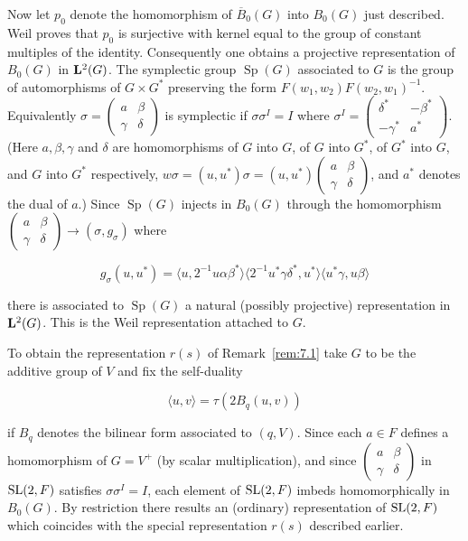 \begin{remark}
Now let $p_0$ denote the homomorphism of $\overline{B}_0(G)$ into $B_0(G)$ just described. Weil proves that $p_0$ is surjective with kernel equal to the group of constant multiples of the identity. Consequently one obtains a projective representation of $B_0(G)$ in $\mathbf{L}^2(G)$. The symplectic group $\operatorname{Sp}(G)$ associated to $G$ is the group of automorphisms of $G \times G^*$ preserving the form $F(w_1, w_2)F(w_2, w_1)^{-1}$. Equivalently $\sigma = \begin{pmatrix} a & \beta \\ \gamma & \delta \end{pmatrix}$ is symplectic if $\sigma\sigma^I = I$ where $\sigma^I = \begin{pmatrix} \delta^* & -\beta^* \\ -\gamma^* & a^* \end{pmatrix}$. (Here $a, \beta, \gamma$ and $\delta$ are homomorphisms of $G$ into $G$, of $G$ into $G^*$, of $G^*$ into $G$, and $G$ into $G^*$ respectively, $w\sigma = (u, u^*)\sigma = (u, u^*)\begin{pmatrix} a & \beta \\ \gamma & \delta \end{pmatrix}$, and $a^*$ denotes the dual of $a$.) Since $\operatorname{Sp}(G)$ injects in $B_0(G)$ through the homomorphism $\begin{pmatrix} a & \beta \\ \gamma & \delta \end{pmatrix} \to (\sigma, g_\sigma)$ where

\[
g_\sigma(u, u^*) = \langle u, 2^{-1}u\alpha\beta^*\rangle \langle 2^{-1}u^*\gamma\delta^*, u^*\rangle \langle u^*\gamma, u\beta\rangle
\]

there is associated to $\operatorname{Sp}(G)$ a natural (possibly projective) representation in $\mathbf{L}^2(G)$. This is the Weil representation attached to $G$.

To obtain the representation $r(s)$ of Remark~\ref{rem:7.1} take $G$ to be the additive group of $V$ and fix the self-duality

\[
\langle u, v \rangle = \tau(2B_q(u, v))
\]

if $B_q$ denotes the bilinear form associated to $(q,V)$. Since each $a \in F$ defines a homomorphism of $G = V^+$ (by scalar multiplication), and since $\begin{pmatrix} a & \beta \\ \gamma & \delta \end{pmatrix}$ in $\operatorname{SL}(2,F)$ satisfies $\sigma\sigma^I = I$, each element of $\operatorname{SL}(2,F)$ imbeds homomorphically in $B_0(G)$. By restriction there results an (ordinary) representation of $\operatorname{SL}(2,F)$ which coincides with the special representation $r(s)$ described earlier.


\end{remark}
